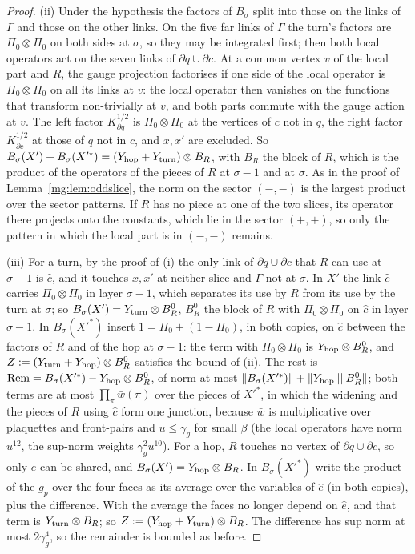 \documentclass[11pt,a4paper]{article}
\theoremstyle{definition}
\theoremstyle{remark}
\newcommand{\norm}[1]{\lVert #1\rVert}
\begin{document}
\begin{proof}
(ii) Under the hypothesis the factors of $B_\sigma$ split into those on the links of $\Gamma$ and those on the other links. On the five far links of $\Gamma$ the
turn's factors are $\Pi_0\otimes\Pi_0$ on both sides at $\sigma$, so they may be integrated first; then both local operators act on the seven links of
$\partial q\cup\partial c$. At a common vertex $v$ of the local part and $R$, the gauge projection factorises if one side of the local operator is
$\Pi_0\otimes\Pi_0$ on all its links at $v$: the local operator then vanishes on the functions that transform non-trivially at $v$, and both parts commute
with the gauge action at $v$. The left factor $K^{1/2}_{\partial q}$ is $\Pi_0\otimes\Pi_0$ at the vertices of $c$ not in $q$, the right factor $K^{1/2}_{\partial c}$ at those
of $q$ not in $c$, and $x,x'$ are excluded. So $B_\sigma(X')+B_\sigma(X'^*)=(Y_{\rm hop}+Y_{\rm turn})\otimes B_R$, with $B_R$ the block of $R$, which is the product of
the operators of the pieces of $R$ at $\sigma-1$ and at $\sigma$. As in the proof of Lemma~\ref{mg:lem:oddslice}, the norm on the sector $(-,-)$ is the largest
product over the sector patterns. If $R$ has no piece at one of the two slices, its operator there projects onto the constants, which lie in the sector $(+,+)$,
so only the pattern in which the local part is in $(-,-)$ remains.

(iii) For a turn, by the proof of (i) the only link of $\partial q\cup\partial c$ that $R$ can use at $\sigma-1$ is $\hat c$, and it touches $x,x'$ at neither slice and $\Gamma$ not
at $\sigma$. In $X'$ the link $\hat c$ carries $\Pi_0\otimes\Pi_0$ in layer $\sigma-1$, which separates its use by $R$ from its use by the turn at $\sigma$; so
$B_\sigma(X')=Y_{\rm turn}\otimes B^0_R$, $B^0_R$ the block of $R$ with $\Pi_0\otimes\Pi_0$ on $\hat c$ in layer $\sigma-1$. In $B_\sigma(X'^*)$ insert $1=\Pi_0+(1-\Pi_0)$, in
both copies, on $\hat c$ between the factors of $R$ and of the hop at $\sigma-1$: the term with $\Pi_0\otimes\Pi_0$ is $Y_{\rm hop}\otimes B^0_R$, and $Z:=(Y_{\rm turn}+Y_{\rm hop})\otimes B^0_R$
satisfies the bound of (ii). The rest is $\mathrm{Rem}=B_\sigma(X'^*)-Y_{\rm hop}\otimes B^0_R$, of norm at most $\norm{B_\sigma(X'^*)}+\norm{Y_{\rm hop}}\norm{B^0_R}$; both terms are at most
$\prod_\pi\bar w(\pi)$ over the pieces of $X'^*$, in which the widening and the pieces of $R$ using $\hat c$ form one junction, because $\bar w$ is multiplicative over
plaquettes and front-pairs and $u\le\gamma_g$ for small $\beta$ (the local operators have norm $u^{12}$, the sup-norm weights $\gamma_g^2u^{10}$). For a hop, $R$ touches no vertex of $\partial q\cup\partial c$, so only $\hat e$ can be shared, and $B_\sigma(X')=Y_{\rm hop}\otimes B_R$. In
$B_\sigma(X'^*)$ write the product of the $g_p$ over the four faces as its average over the variables of $\hat e$ (in both copies), plus the difference. With the
average the faces no longer depend on $\hat e$, and that term is $Y_{\rm turn}\otimes B_R$; so $Z:=(Y_{\rm hop}+Y_{\rm turn})\otimes B_R$. The difference has sup norm at most
$2\gamma_g^4$, so the remainder is bounded as before.
\end{proof}
\end{document}
